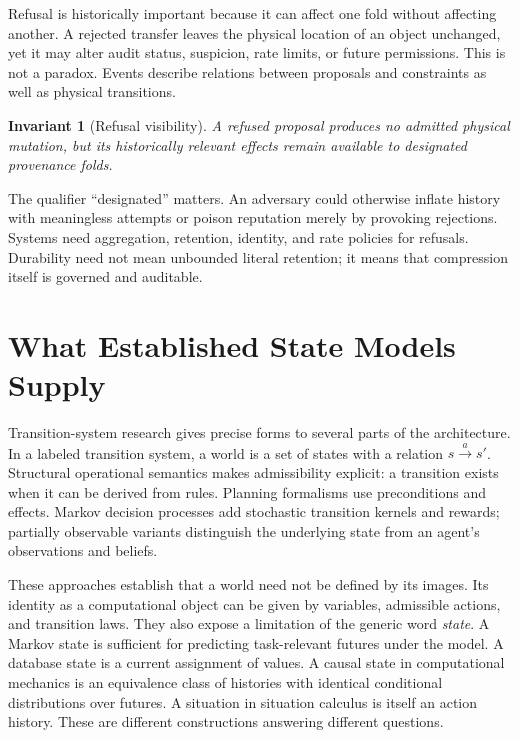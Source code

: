 \documentclass[11pt]{article}
\newtheorem{invariant}{Invariant}
\begin{document}
Refusal is historically important because it can affect one fold without affecting another. A rejected transfer leaves the physical location of an object unchanged, yet it may alter audit status, suspicion, rate limits, or future permissions. This is not a paradox. Events describe relations between proposals and constraints as well as physical transitions.

\begin{invariant}[Refusal visibility]
A refused proposal produces no admitted physical mutation, but its historically relevant effects remain available to designated provenance folds.
\end{invariant}

The qualifier ``designated'' matters. An adversary could otherwise inflate history with meaningless attempts or poison reputation merely by provoking rejections. Systems need aggregation, retention, identity, and rate policies for refusals. Durability need not mean unbounded literal retention; it means that compression itself is governed and auditable.

\section{What Established State Models Supply}

Transition-system research gives precise forms to several parts of the architecture. In a labeled transition system, a world is a set of states with a relation $s\xrightarrow{a}s'$. Structural operational semantics makes admissibility explicit: a transition exists when it can be derived from rules. Planning formalisms use preconditions and effects. Markov decision processes add stochastic transition kernels and rewards; partially observable variants distinguish the underlying state from an agent's observations and beliefs.

These approaches establish that a world need not be defined by its images. Its identity as a computational object can be given by variables, admissible actions, and transition laws. They also expose a limitation of the generic word \emph{state}. A Markov state is sufficient for predicting task-relevant futures under the model. A database state is a current assignment of values. A causal state in computational mechanics is an equivalence class of histories with identical conditional distributions over futures. A situation in situation calculus is itself an action history. These are different constructions answering different questions.
\end{document}
